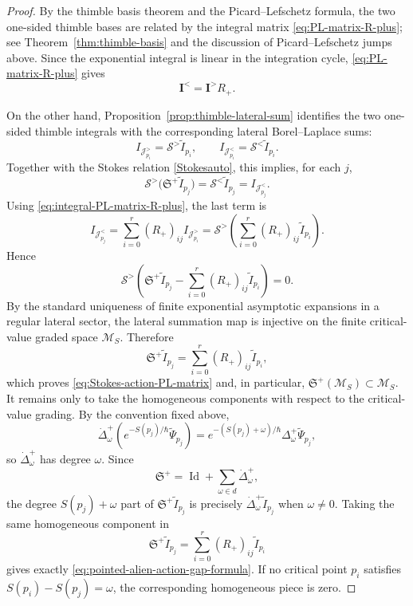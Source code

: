 \documentclass[11pt]{amsart}
\DeclareMathOperator{\Id}{Id}
\theoremstyle{plain}
\newcommand{\J}{\mathcal J}
\begin{document}
\begin{proof}
By the thimble basis theorem and the Picard--Lefschetz formula, the two
one-sided thimble bases are related by the integral matrix
\eqref{eq:PL-matrix-R-plus}; see Theorem~\ref{thm:thimble-basis} and the
discussion of Picard--Lefschetz jumps above.  Since the exponential integral
is linear in the integration cycle, \eqref{eq:PL-matrix-R-plus} gives
\begin{equation}\label{eq:integral-PL-matrix-R-plus}
\mathbf I^{<}=\mathbf I^{>}R_+ .
\end{equation}

On the other hand, Proposition~\ref{prop:thimble-lateral-sum} identifies the
two one-sided thimble integrals with the corresponding lateral
Borel--Laplace sums:
\[
I_{\J_{p_i}^{>}}=\mathcal S^{>}\widetilde I_{p_i},
\qquad
I_{\J_{p_i}^{<}}=\mathcal S^{<}\widetilde I_{p_i}.
\]
Together with the Stokes relation \eqref{Stokesauto}, this implies, for each
\(j\),
\[
\mathcal S^{>}
\bigl(\mathfrak S^+\widetilde I_{p_j}\bigr)
=
\mathcal S^{<}\widetilde I_{p_j}
=
I_{\J_{p_j}^{<}}.
\]
Using \eqref{eq:integral-PL-matrix-R-plus}, the last term is
\[
I_{\J_{p_j}^{<}}
=
\sum_{i=0}^r (R_+)_{ij} I_{\J_{p_i}^{>}}
=
\mathcal S^{>}
\left(
\sum_{i=0}^r (R_+)_{ij}\widetilde I_{p_i}
\right).
\]
Hence
\[
\mathcal S^{>}
\left(
\mathfrak S^+\widetilde I_{p_j}
-
\sum_{i=0}^r (R_+)_{ij}\widetilde I_{p_i}
\right)=0.
\]
By the standard uniqueness of finite exponential asymptotic expansions in a
regular lateral sector, the lateral summation map is injective on the finite
critical-value graded space \(\mathcal M_S\).  Therefore
\[
\mathfrak S^+\widetilde I_{p_j}
=
\sum_{i=0}^r (R_+)_{ij}\widetilde I_{p_i},
\]
which proves \eqref{eq:Stokes-action-PL-matrix} and, in particular,
\(\mathfrak S^+(\mathcal M_S)\subset\mathcal M_S\). It remains only to take the homogeneous components with respect to the
critical-value grading.  By the convention fixed above,
\[
\dot\Delta_\omega^+
\left(
e^{-S(p_j)/\hbar}\widetilde\Psi_{p_j}
\right)
=
e^{-(S(p_j)+\omega)/\hbar}
\Delta_\omega^+\widetilde\Psi_{p_j},
\]
so \(\dot\Delta_\omega^+\) has degree \(\omega\).  Since
\[
\mathfrak S^+=\Id+\sum_{\omega\in d}\dot\Delta_\omega^+,
\]
the degree \(S(p_j)+\omega\) part of
\(\mathfrak S^+\widetilde I_{p_j}\) is precisely
\(\dot\Delta_\omega^+\widetilde I_{p_j}\) when \(\omega\neq0\).  Taking the
same homogeneous component in
\[
\mathfrak S^+\widetilde I_{p_j}
=
\sum_{i=0}^r (R_+)_{ij}\widetilde I_{p_i}
\]
gives exactly \eqref{eq:pointed-alien-action-gap-formula}.  If no critical
point \(p_i\) satisfies \(S(p_i)-S(p_j)=\omega\), the corresponding homogeneous
piece is zero.
\end{proof}
\end{document}
